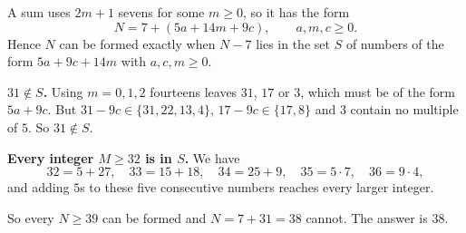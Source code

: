 A sum uses $2m+1$ sevens for some $m\ge0$, so it has the form
\[N=7+(5a+14m+9c),\qquad a,m,c\ge0.\]
Hence $N$ can be formed exactly when $N-7$ lies in the set $S$ of numbers of the form $5a+9c+14m$ with $a,c,m\ge0$.

\textbf{$31\notin S$.} Using $m=0,1,2$ fourteens leaves $31$, $17$ or $3$, which must be of the form $5a+9c$. But $31-9c\in\{31,22,13,4\}$, $17-9c\in\{17,8\}$ and $3$ contain no multiple of $5$. So $31\notin S$.

\textbf{Every integer $M\ge32$ is in $S$.} We have
\[32=5+27,\quad 33=15+18,\quad 34=25+9,\quad 35=5\cdot7,\quad 36=9\cdot4,\]
and adding $5$s to these five consecutive numbers reaches every larger integer.

So every $N\ge39$ can be formed and $N=7+31=38$ cannot. The answer is $\boxed{38}$.
